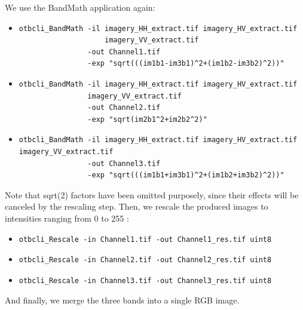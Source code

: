 We use the BandMath application again:

\begin{itemize}
\item 
\begin{verbatim} 
otbcli_BandMath -il imagery_HH_extract.tif imagery_HV_extract.tif
                    imagery_VV_extract.tif 
                -out Channel1.tif 
                -exp "sqrt(((im1b1-im3b1)^2+(im1b2-im3b2)^2))" 
\end{verbatim}
									  
\item 
\begin{verbatim} 
otbcli_BandMath -il imagery_HH_extract.tif imagery_HV_extract.tif 
                imagery_VV_extract.tif 
                -out Channel2.tif 
                -exp "sqrt(im2b1^2+im2b2^2)" 
\end{verbatim}
									  
\item 
\begin{verbatim} 
otbcli_BandMath -il imagery_HH_extract.tif imagery_HV_extract.tif
imagery_VV_extract.tif 
                -out Channel3.tif 
                -exp "sqrt(((im1b1+im3b1)^2+(im1b2+im3b2)^2))" 
\end{verbatim}
\end{itemize}

Note that sqrt(2) factors have been omitted purposely, since their effects will
be canceled by the rescaling step. Then, we rescale the produced images to
intensities ranging from 0 to 255 :

\begin{itemize}
\item 
\begin{verbatim} 
otbcli_Rescale -in Channel1.tif -out Channel1_res.tif uint8 
\end{verbatim}
									  
\item 
\begin{verbatim} 
otbcli_Rescale -in Channel2.tif -out Channel2_res.tif uint8 
\end{verbatim}
									  
\item 
\begin{verbatim} 
otbcli_Rescale -in Channel3.tif -out Channel3_res.tif uint8 
\end{verbatim}
\end{itemize}

And finally, we merge the three bands into a single RGB image.

